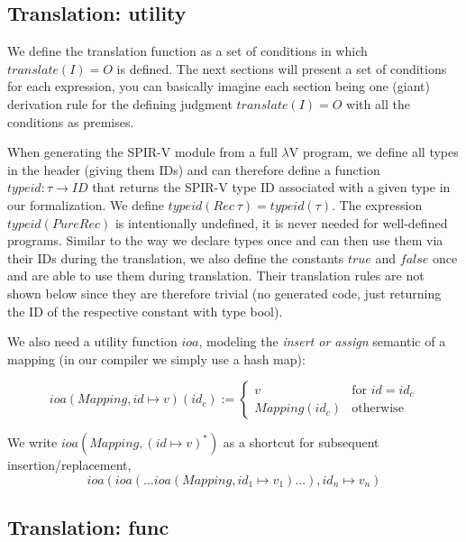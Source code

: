 \documentclass[letterpaper,12pt]{article}
\begin{document}
\subsection{Translation: utility}

We define the translation function as a set of conditions in which $translate(I) = O$
is defined. The next sections will present a set of conditions for each
expression, you can basically imagine each section being one (giant)
derivation rule for the defining judgment $translate(I) = O$
with all the conditions as premises. 

When generating the SPIR-V module from a full $\lambda$V program,
we define all types in the header (giving them IDs) and can therefore define a
function $typeid: \tau \rightarrow ID$ that returns the SPIR-V type ID
associated with a given type in our formalization. 
We define $typeid(Rec\: \tau) = typeid(\tau)$. The expression $typeid(PureRec)$
is intentionally undefined, it is never needed for well-defined programs.
Similar to the way we declare types once and can then use them via their
IDs during the translation, we also define the constants $true$ and $false$
once and are able to use them during translation. Their translation
rules are not shown below since they are therefore trivial (no generated
code, just returning the ID of the respective constant with type bool).

We also need a utility function $ioa$, modeling
the \textit{insert or assign} semantic of a mapping (in our compiler
we simply use a hash map):

\[
	ioa(Mapping, id \mapsto v)(id_c) :=
	\begin{cases}
		v & \text{for } id = id_c \\
		Mapping(id_c) & \text{otherwise}
	\end{cases}
\]

We write $ioa(Mapping, (id \mapsto v)^*)$ as a shortcut for subsequent
insertion/replacement, \\
\[
	ioa(ioa( \dots ioa(Mapping, id_1 \mapsto v_1) \dots ), id_n \mapsto v_n)
\]

\subsection{Translation: func}
\end{document}
